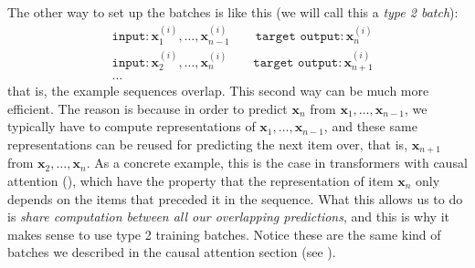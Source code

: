 The other way to set up the batches is like this (we will call this a \textit{type 2 batch}):
\begin{align}
    &\texttt{input}: \mathbf{x}_1^{(i)}, \dots, \mathbf{x}_{n-1}^{(i)} \quad\quad \texttt{target output}: \mathbf{x}_n^{(i)}\\
    &\texttt{input}: \mathbf{x}_2^{(i)}, \dots, \mathbf{x}_{n}^{(i)} \quad\quad \texttt{target output}: \mathbf{x}_{n+1}^{(i)}\\
    &\ldots\nonumber
\end{align}
that is, the example sequences overlap. This second way can be much more efficient. The reason is because in order to predict $\mathbf{x}_n$ from $\mathbf{x}_1, \dots, \mathbf{x}_{n-1}$, we typically have to compute representations of $\mathbf{x}_1, \dots, \mathbf{x}_{n-1}$, and these same representations can be reused for predicting the next item over, that is, $\mathbf{x}_{n+1}$ from $\mathbf{x}_2, \dots, \mathbf{x}_n$. As a concrete example, this is the case in transformers with causal attention (\sect{\ref{sec:transformers:masked_attention}}), which have the property that the representation of item $\mathbf{x}_{n}$ only depends on the items that preceded it in the sequence. What this allows us to do is \textit{share computation between all our overlapping predictions}, and this is why it makes sense to use type 2 training batches. Notice these are the same kind of batches we described in the causal attention section (see \eqn{\ref{eqn:transformers:causal_training_batches}}).



